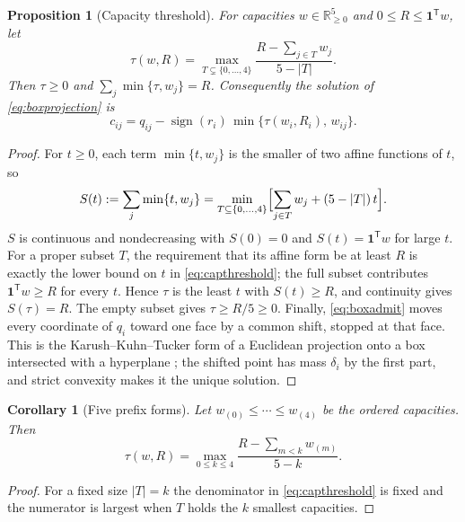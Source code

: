 \documentclass[journal]{IEEEtran}
\newtheorem{proposition}{Proposition}
\newtheorem{corollary}{Corollary}
\newcommand{\R}{\mathbb{R}}
\begin{document}
\begin{proposition}[Capacity threshold]
\label{prop:capacity}
For capacities \(w\in\R_{\ge0}^5\) and \(0\le R\le\bm1^{\mathsf T}w\), let
\begin{equation}
 \tau(w,R)=\max_{T\subsetneq\{0,\ldots,4\}}
 \frac{R-\sum_{j\in T}w_j}{5-|T|}.
 \label{eq:capthreshold}
\end{equation}
Then \(\tau\ge0\) and \(\sum_j\min\{\tau,w_j\}=R\). Consequently the
solution of \eqref{eq:boxprojection} is
\begin{equation}
 \boxed{c_{ij}=q_{ij}-\operatorname{sign}(r_i)\,
 \min\{\tau(w_i,R_i),\,w_{ij}\}.}
 \label{eq:boxadmit}
\end{equation}
\end{proposition}

\begin{proof}
For \(t\ge0\), each term \(\min\{t,w_j\}\) is the smaller of two affine
functions of \(t\), so
\[
 S(t):=\sum_j\min\{t,w_j\}
 =\min_{T\subseteq\{0,\ldots,4\}}
 \Bigl[\sum_{j\in T}w_j+(5-|T|)\,t\Bigr].
\]
\(S\) is continuous and nondecreasing with \(S(0)=0\) and
\(S(t)=\bm1^{\mathsf T}w\) for large \(t\). For a proper subset \(T\), the
requirement that its affine form be at least \(R\) is exactly the lower
bound on \(t\) in \eqref{eq:capthreshold}; the full subset contributes
\(\bm1^{\mathsf T}w\ge R\) for every \(t\). Hence \(\tau\) is the least
\(t\) with \(S(t)\ge R\), and continuity gives \(S(\tau)=R\). The empty
subset gives \(\tau\ge R/5\ge0\). Finally, \eqref{eq:boxadmit} moves every
coordinate of \(q_i\) toward one face by a common shift, stopped at that
face. This is the Karush--Kuhn--Tucker form of a Euclidean projection onto
a box intersected with a hyperplane \cite{brucker1984,condat2016}; the
shifted point has mass \(\delta_i\) by the first part, and strict
convexity makes it the unique solution.
\end{proof}

\begin{corollary}[Five prefix forms]
\label{cor:prefix}
Let \(w_{(0)}\le\cdots\le w_{(4)}\) be the ordered capacities. Then
\begin{equation}
 \tau(w,R)=\max_{0\le k\le4}
 \frac{R-\sum_{m<k}w_{(m)}}{5-k}.
 \label{eq:capprefix}
\end{equation}
\end{corollary}

\begin{proof}
For a fixed size \(|T|=k\) the denominator in \eqref{eq:capthreshold} is
fixed and the numerator is largest when \(T\) holds the \(k\) smallest
capacities.
\end{proof}
\end{document}
